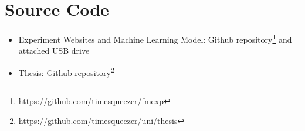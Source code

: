 \documentclass[
    fontsize=12pt,
    headings=small,
    parskip=half,           %
    bibliography=totoc,
    numbers=noenddot,       %
    open=any,               %
    final,                   %
    table
]{scrreprt}
\begin{document}
\section*{Source Code}

\begin{itemize}
    \item Experiment Websites and Machine Learning Model: Github repository\footnote{\url{https://github.com/timesqueezer/fmexp}} and attached USB drive
    \item Thesis: Github repository\footnote{\url{https://github.com/timesqueezer/uni/thesis}}
\end{itemize}
\end{document}

